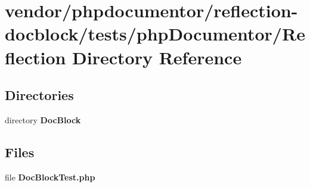 \section{vendor/phpdocumentor/reflection-\/docblock/tests/php\+Documentor/\+Reflection Directory Reference}
\label{dir_61026ad79fc72495c7f16c09687a4ccb}
\subsection*{Directories}
\begin{DoxyCompactItemize}
\item 
directory {\bf Doc\+Block}
\end{DoxyCompactItemize}
\subsection*{Files}
\begin{DoxyCompactItemize}
\item 
file {\bf Doc\+Block\+Test.\+php}
\end{DoxyCompactItemize}
